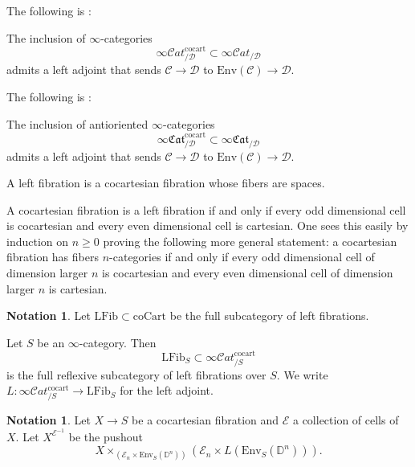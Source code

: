 \documentclass[10pt,oneside]{article}
\numberwithin{equation}{section} %
\numberwithin{figure}{section} %
\theoremstyle{plain}
\theoremstyle{definition}
\newtheorem{notation}[thm]{Notation}
\newcommand{\bD}{{\mathbb D}}
\newcommand{\mC}{{\mathcal C}}
\newcommand{\mD}{{\mathcal D}}
\newcommand{\mE}{{\mathcal E}}
\newcommand{\Env}{{\mathrm{Env}}}
\newcommand{\cocart}{{\mathrm{cocart}}}
\newcommand{\coCart}{{\mathrm{coCart}}}
\newcommand{\scat}{\mathcal{C}\mathit{at}}
\newcommand{\fcat}{\mathfrak{Cat}}
\newcommand{\LFib}{\mathrm{LFib}}
\begin{document}
The following is \cite[Corollary 4.5.9.]{gepner2026fibrations}:

\begin{corollary}\label{huip}
The inclusion of $\infty$-categories $$\infty\scat^\cocart_{/\mD}\subset \infty\scat_{/\mD}$$
admits a left adjoint that sends $\mC \to \mD$ 
to $\Env(\mC) \to \mD$.
\end{corollary}

The following is \cite[Theorem 5.1.17.]{gepner2026fibrations}:

\begin{corollary}
The inclusion of antioriented $\infty$-categories $$\infty\fcat^\cocart_{/\mD}\subset \infty\fcat_{/\mD}$$
admits a left adjoint that sends $\mC \to \mD$ 
to $\Env(\mC) \to \mD$.
\end{corollary}

\begin{definition}
A left fibration is a cocartesian fibration whose fibers are spaces.
    
\end{definition}

\begin{remark}

A cocartesian fibration is a left fibration if and only if
every odd dimensional cell is cocartesian and every even dimensional cell is cartesian.
One sees this easily by induction on $n \geq 0$ proving the following more general statement: a cocartesian fibration has fibers $n$-categories 
if and only if every odd dimensional cell of dimension larger $n$ is cocartesian and every even dimensional cell of dimension larger $n$ is cartesian.
    
\end{remark}

\begin{notation}
Let $\LFib \subset \coCart$ be the full subcategory of left fibrations.
    
\end{notation}

\begin{remark} Let $S$ be an $\infty$-category.
Then $$ \LFib_S \subset \infty\scat^\cocart_{/S}$$ is the full reflexive subcategory of left fibrations over $S.$
We write $ L: \infty\scat^\cocart_{/S} \to \LFib_S $ for the left adjoint.
    
\end{remark}

\begin{notation}\label{fibinv}
Let $X \to S$ be a cocartesian fibration and $\mE $ a collection of cells of $X.$
Let $X^{\mE^{-1}}$ be the pushout
$$  X \times _{(\mE_n \times \Env_S(\bD^n))} (\mE_n \times L(\Env_S(\bD^n))).$$
    
\end{notation}
\end{document}
